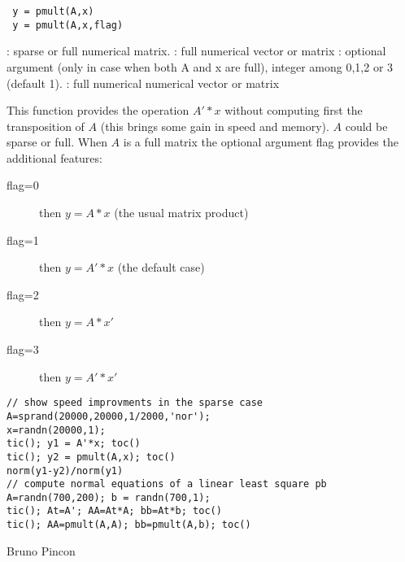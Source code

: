 
\begin{mandesc}
\end{mandesc}

\begin{calling_sequence}
\begin{verbatim}
 y = pmult(A,x) 
 y = pmult(A,x,flag)
\end{verbatim}
\end{calling_sequence}
\begin{parameters}
  \begin{varlist}
    :  sparse or full numerical matrix.
    : full numerical vector or matrix
    : optional argument (only in case when both A and x are full), integer among 0,1,2 or 3 (default 1).
    : full numerical numerical vector or matrix
  \end{varlist}
\end{parameters}

\begin{mandescription}
This function provides the operation $A'*x$ without computing first the transposition of $A$
(this brings some gain in speed and memory). $A$ could be sparse or full. When $A$ is a full
matrix the optional argument flag provides the additional features:
\begin{description}
\item[flag=0] then $y = A*x$ (the usual matrix product)
\item[flag=1] then $y = A'*x$ (the default case)
\item[flag=2] then $y = A*x'$
\item[flag=3] then $y = A'*x'$
\end{description} 
\end{mandescription}

\begin{examples}
\begin{Verbatim}
// show speed improvments in the sparse case
A=sprand(20000,20000,1/2000,'nor');
x=randn(20000,1); 
tic(); y1 = A'*x; toc()  
tic(); y2 = pmult(A,x); toc() 
norm(y1-y2)/norm(y1)
// compute normal equations of a linear least square pb
A=randn(700,200); b = randn(700,1);
tic(); At=A'; AA=At*A; bb=At*b; toc()
tic(); AA=pmult(A,A); bb=pmult(A,b); toc()
\end{Verbatim}
\end{examples}


\begin{authors}
   Bruno Pincon
\end{authors}
